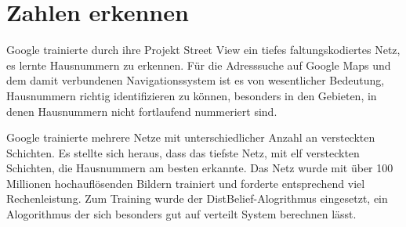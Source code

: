 
\section{Zahlen erkennen}

Google trainierte durch ihre Projekt Street View \citep{streetview} ein tiefes faltungskodiertes Netz, es lernte Hausnummern zu erkennen. Für die Adresssuche auf Google Maps und dem damit verbundenen Navigationssystem ist es von wesentlicher Bedeutung, Hausnummern richtig identifizieren zu können, besonders in den Gebieten, in denen Hausnummern nicht fortlaufend nummeriert sind.

Google trainierte mehrere Netze mit unterschiedlicher Anzahl an versteckten Schichten. Es stellte sich heraus, dass das tiefste Netz, mit elf versteckten Schichten, die Hausnummern am besten erkannte. Das Netz wurde mit über 100 Millionen hochauflösenden Bildern trainiert und forderte entsprechend viel Rechenleistung. Zum Training wurde der DistBelief-Alogrithmus \citep{distbelief} eingesetzt, ein Alogorithmus der sich besonders gut auf verteilt System berechnen lässt. 

